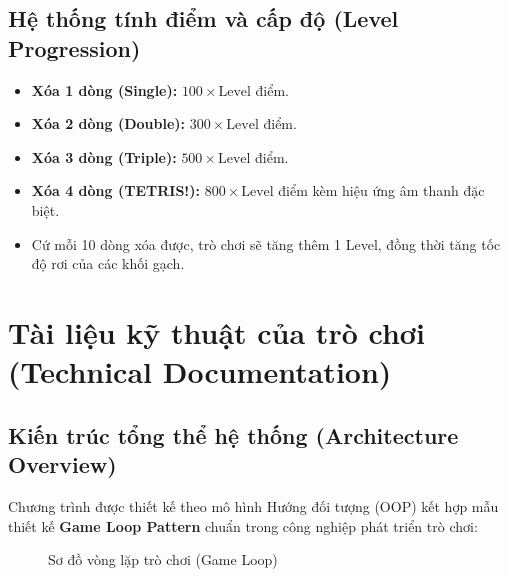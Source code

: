 \documentclass[12pt,a4paper]{article}
\begin{document}
\subsection{Hệ thống tính điểm và cấp độ (Level Progression)}
\begin{itemize}
    \item \textbf{Xóa 1 dòng (Single):} $100 \times \text{Level}$ điểm.
    \item \textbf{Xóa 2 dòng (Double):} $300 \times \text{Level}$ điểm.
    \item \textbf{Xóa 3 dòng (Triple):} $500 \times \text{Level}$ điểm.
    \item \textbf{Xóa 4 dòng (TETRIS!):} $800 \times \text{Level}$ điểm kèm hiệu ứng âm thanh đặc biệt.
    \item Cứ mỗi 10 dòng xóa được, trò chơi sẽ tăng thêm 1 Level, đồng thời tăng tốc độ rơi của các khối gạch.
\end{itemize}

\newpage

\section{Tài liệu kỹ thuật của trò chơi (Technical Documentation)}

\subsection{Kiến trúc tổng thể hệ thống (Architecture Overview)}
Chương trình được thiết kế theo mô hình Hướng đối tượng (OOP) kết hợp mẫu thiết kế \textbf{Game Loop Pattern} chuẩn trong công nghiệp phát triển trò chơi:

\begin{figure}[h!]
\centering
{}
\caption{Sơ đồ vòng lặp trò chơi (Game Loop)}
\end{figure}
\end{document}
